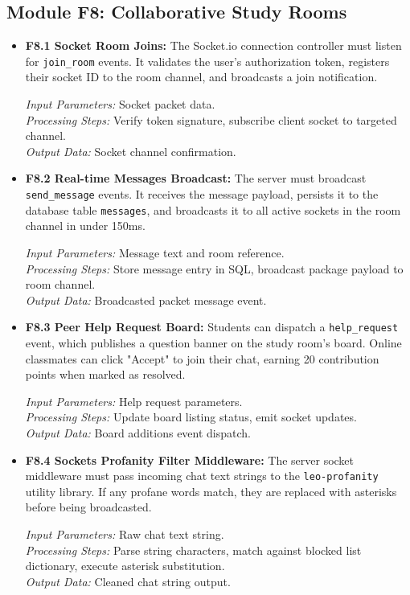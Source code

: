 \documentclass[12,Times new Roman,a4paper]{report}
\begin{document}
\subsection{Module F8: Collaborative Study Rooms}
\begin{itemize}
    \item \textbf{F8.1 Socket Room Joins:} The Socket.io connection controller must listen for \texttt{join\_room} events. It validates the user's authorization token, registers their socket ID to the room channel, and broadcasts a join notification.
    
    \textit{Input Parameters:} Socket packet data. \\
    \textit{Processing Steps:} Verify token signature, subscribe client socket to targeted channel. \\
    \textit{Output Data:} Socket channel confirmation.
    
    \item \textbf{F8.2 Real-time Messages Broadcast:} The server must broadcast \texttt{send\_message} events. It receives the message payload, persists it to the database table \texttt{messages}, and broadcasts it to all active sockets in the room channel in under 150ms.
    
    \textit{Input Parameters:} Message text and room reference. \\
    \textit{Processing Steps:} Store message entry in SQL, broadcast package payload to room channel. \\
    \textit{Output Data:} Broadcasted packet message event.
    
    \item \textbf{F8.3 Peer Help Request Board:} Students can dispatch a \texttt{help\_request} event, which publishes a question banner on the study room's board. Online classmates can click "Accept" to join their chat, earning 20 contribution points when marked as resolved.
    
    \textit{Input Parameters:} Help request parameters. \\
    \textit{Processing Steps:} Update board listing status, emit socket updates. \\
    \textit{Output Data:} Board additions event dispatch.
    
    \item \textbf{F8.4 Sockets Profanity Filter Middleware:} The server socket middleware must pass incoming chat text strings to the \texttt{leo-profanity} utility library. If any profane words match, they are replaced with asterisks before being broadcasted.
    
    \textit{Input Parameters:} Raw chat text string. \\
    \textit{Processing Steps:} Parse string characters, match against blocked list dictionary, execute asterisk substitution. \\
    \textit{Output Data:} Cleaned chat string output.
\end{itemize}
\end{document}
